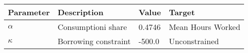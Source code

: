 \begin{tabular}{l l l l} 
\hline 
Parameter & Description & Value & Target \\ 
\hline 
$\alpha$ & Consumptioni share & 0.4746 & Mean Hours Worked \\ 
$\kappa$ & Borrowing constraint & -500.0 & Unconstrained \\ 
\hline 
\end{tabular}
